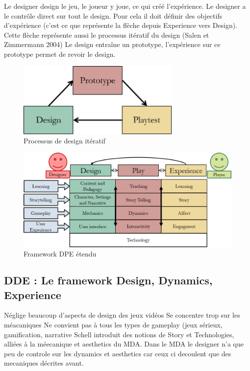 Le designer design le jeu, le joueur y joue, ce qui créé l'expérience.
Le designer a le contrôle direct sur tout le design. Pour cela il doit définir des objectifs d'expérience (c'est ce que représente la flèche depuis Experience vers Design). Cette flèche représente aussi le processus itératif du design (Salen et Zimmermann 2004) Le design entraîne un prototype, l'expérience sur ce prototype permet de revoir le design.

\begin{figure}[H]
    \centering
    \includegraphics[width=8cm]{10_img/chap3/iteration_prototype.png} 
    \caption{Processus de design itératif \cite{Winn2011}}
\end{figure}

\begin{figure}[H]
    \centering
    \includegraphics[width=14cm]{10_img/chap3/dpe_extended.png} 
    \caption{Framework DPE étendu \cite{Winn2011}}
\end{figure}



\subsection{DDE : Le framework Design, Dynamics, Experience \cite{DDE}}

Néglige beaucoup d'aspects de design des jeux vidéos
Se concentre trop sur les méacaniques
Ne convient pas à tous les types de gameplay (jeux sérieux, gamification, narrative
Schell introduit des notions de Story et Technologies, alliées à la méecanique et aesthetics du MDA. 
Dans le MDA le designer n'a que peu de controle sur les dynamics et aesthetics car ceux ci decoulent que des mecaniques décrites avant.

